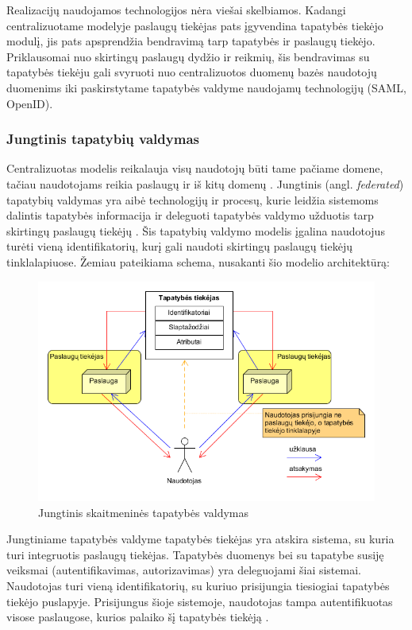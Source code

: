 Realizacijų naudojamos technologijos nėra viešai skelbiamos. Kadangi centralizuotame modelyje paslaugų tiekėjas
pats įgyvendina tapatybės tiekėjo modulį, jis pats apsprendžia bendravimą tarp tapatybės ir paslaugų tiekėjo. Priklausomai
nuo skirtingų paslaugų dydžio ir reikmių, šis bendravimas su tapatybės tiekėju gali svyruoti nuo centralizuotos duomenų bazės
naudotojų duomenims iki
paskirstytame tapatybės valdyme naudojamų technologijų (SAML, OpenID).

\subsubsection{Jungtinis tapatybių valdymas}


Centralizuotas modelis reikalauja visų naudotojų būti tame pačiame domene, tačiau naudotojams reikia
paslaugų ir iš kitų domenų \cite{Cao2010}. Jungtinis (angl. \textit{federated}) tapatybių valdymas yra aibė technologijų
ir procesų, kurie leidžia sistemoms dalintis tapatybės informacija ir deleguoti tapatybės valdymo užduotis
tarp skirtingų paslaugų tiekėjų \cite{Maler2008}. Šis tapatybių valdymo modelis įgalina naudotojus turėti vieną
identifikatorių, kurį gali naudoti skirtingų paslaugų tiekėjų tinklalapiuose. Žemiau pateikiama schema, nusakanti
šio modelio architektūrą:

\begin{figure}[H]
    \centering
    \includegraphics[scale=0.75]{img/federatedModel}
    \caption{Jungtinis skaitmeninės tapatybės valdymas \cite{Cao2010}}
    \label{fig:federatedModel}
\end{figure}

Jungtiniame tapatybės valdyme tapatybės tiekėjas yra atskira sistema, su kuria turi integruotis paslaugų tiekėjas. Tapatybės
duomenys bei su tapatybe susiję veiksmai (autentifikavimas, autorizavimas) yra deleguojami šiai sistemai. Naudotojas turi vieną identifikatorių,
su kuriuo prisijungia tiesiogiai tapatybės tiekėjo puslapyje. Prisijungus šioje sistemoje, naudotojas tampa
autentifikuotas visose paslaugose, kurios palaiko šį tapatybės tiekėją \cite{Maler2008}.

